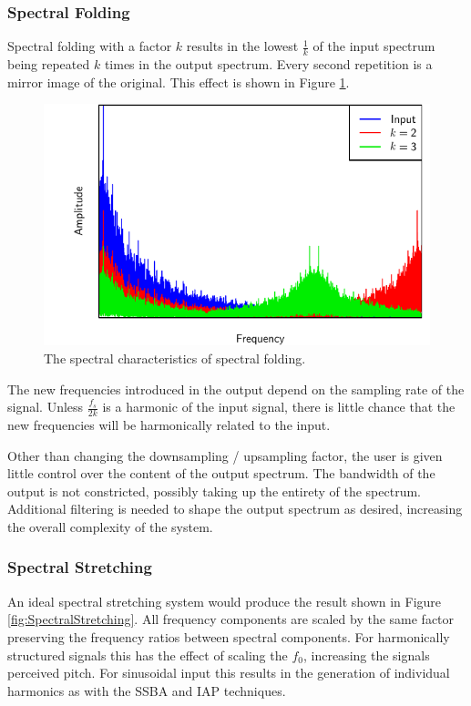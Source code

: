		\subsubsection*{Spectral Folding}
			Spectral folding with a factor $k$ results in the lowest $\frac{1}{k}$ of the input spectrum being
			repeated $k$ times in the output spectrum. Every second repetition is a mirror image of the
			original. This effect is shown in Figure \ref{fig:SpectralFolding}. 
			
			\begin{figure}[h!]
				\centering
				\includegraphics{chapter5/Images/SpectralFoldingSpectrum.pdf}
				\caption{The spectral characteristics of spectral folding.}
				\label{fig:SpectralFolding}
			\end{figure}

			The new frequencies introduced in the output depend on the sampling rate of the signal. Unless
			$\frac{f_{s}}{2k}$ is a harmonic of the input signal, there is little chance that the new
			frequencies will be harmonically related to the input.

			Other than changing the downsampling / upsampling factor, the user is given little control over the
			content of the output spectrum. The bandwidth of the output is not constricted, possibly taking up
			the entirety of the spectrum. Additional filtering is needed to shape the output spectrum as
			desired, increasing the overall complexity of the system.

		\subsubsection*{Spectral Stretching}
			An ideal spectral stretching system would produce the result shown in Figure
			\ref{fig:SpectralStretching}. All frequency components are scaled by the same factor preserving the
			frequency ratios between spectral components. For harmonically structured signals this has the
			effect of scaling the $f_{0}$, increasing the signals perceived pitch. For sinusoidal input this
			results in the generation of individual harmonics as with the SSBA and IAP techniques.
			
